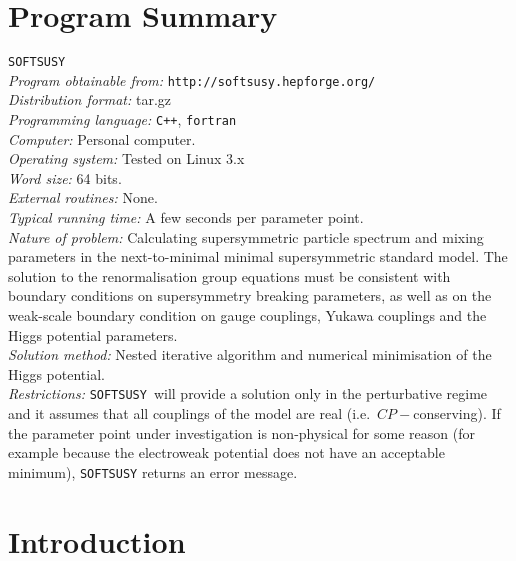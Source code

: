 \documentclass[final,3p,times,pdflatex]{elsarticle}
\def\SOFTSUSY{{\tt SOFTSUSY}}
\begin{document}
\section{Program Summary}
 \SOFTSUSY{}\\
{\em Program obtainable   from:} {\tt http://softsusy.hepforge.org/}\\
{\em Distribution format:}\/ tar.gz\\
{\em Programming language:} {\tt C++}, {\tt fortran}\\
{\em Computer:}\/ Personal computer.\\
{\em Operating system:}\/ Tested on Linux 3.x\\
{\em Word size:}\/ 64 bits.\\
{\em External routines:}\/ None.\\
{\em Typical running time:}\/ A few seconds per parameter point.\\
{\em Nature of problem:}\/ Calculating supersymmetric particle spectrum and
mixing parameters in the next-to-minimal minimal supersymmetric standard
model. The solution to the renormalisation group equations must be consistent
with boundary conditions on supersymmetry breaking parameters, as
well as on the weak-scale boundary condition on gauge 
couplings, Yukawa couplings and the Higgs potential parameters.\\
{\em Solution method:}\/ Nested iterative algorithm and numerical minimisation
of the Higgs potential. \\
{\em Restrictions:} \SOFTSUSY~will provide a solution only in the
perturbative regime and it
assumes that all couplings of the model are real
(i.e.\ $CP-$conserving). If the parameter point under investigation is
non-physical for some reason (for example because the electroweak potential
does not have an acceptable minimum), \SOFTSUSY{} returns an error message.

\newpage

\section{Introduction}
\end{document}
